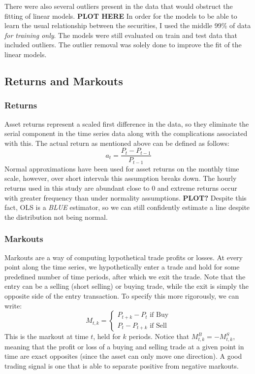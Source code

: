 \documentclass{article}
\begin{document}
There were
also several outliers present in the data that would obstruct the fitting of linear models. 
\textbf{PLOT HERE} In 
order for the models to be able to learn the usual relationship between the securities, I used
the middle 99\% of data \textit{for training only}. The models were still evaluated on train and
test data that included outliers. The outlier removal was solely done to improve the fit of the
linear models.


\subsection{Returns and Markouts}
\subsubsection{Returns}
Asset returns represent 
a scaled first difference in the data, so they eliminate the serial component in the 
time series data along with the complications associated with this. The actual return 
as mentioned above can be defined as follows:
$$a_t = \frac{P_t - P_{t-1}}{P_{t-1}}$$
Normal approximations
have been used for asset returns on the monthly time scale, however, over short intervals this
assumption breaks down. The hourly returns used in this study are abundant close to 0 and 
extreme returns occur with greater frequency than under normality assumptions. \textbf{PLOT?}
Despite this fact, OLS is a \textit{BLUE} estimator, so we can still confidently estimate 
a line despite the distribution not being normal. 
\subsubsection{Markouts}
Markouts are a way of computing hypothetical trade profits or losses. At every point along the
time series, we hypothetically enter a trade and hold for some predefined number of time 
periods, after which we exit the trade. Note that the entry can be a selling (short selling)
or buying trade, while the exit is simply the opposite side of the entry transaction. To 
specify this more rigorously, we can write:
$$M_{t,k} = \begin{cases} 
P_{t+k} - P_t \text { if Buy}\\
P_t - P_{t+k} \text { if Sell}
\end{cases}$$
This is the markout at time $t$, held for $k$ periods. Notice that $M^B_{t,k} = -M^S_{t,k}$,
meaning that the profit or loss of a buying and selling trade at a given point in time are 
exact opposites (since the asset can only move one direction). A good trading signal is one
that is able to separate positive from negative markouts. 
\end{document}
